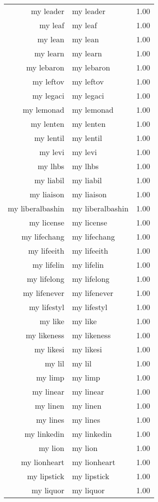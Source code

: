 \begin{table}[ht]
\begin{tabular}{rlr}
  my leader & my leader & 1.00 \\ 
  my leaf & my leaf & 1.00 \\ 
  my lean & my lean & 1.00 \\ 
  my learn & my learn & 1.00 \\ 
  my lebaron & my lebaron & 1.00 \\ 
  my leftov & my leftov & 1.00 \\ 
  my legaci & my legaci & 1.00 \\ 
  my lemonad & my lemonad & 1.00 \\ 
  my lenten & my lenten & 1.00 \\ 
  my lentil & my lentil & 1.00 \\ 
  my levi & my levi & 1.00 \\ 
  my lhbs & my lhbs & 1.00 \\ 
  my liabil & my liabil & 1.00 \\ 
  my liaison & my liaison & 1.00 \\ 
  my liberalbashin & my liberalbashin & 1.00 \\ 
  my license & my license & 1.00 \\ 
  my lifechang & my lifechang & 1.00 \\ 
  my lifeeith & my lifeeith & 1.00 \\ 
  my lifelin & my lifelin & 1.00 \\ 
  my lifelong & my lifelong & 1.00 \\ 
  my lifenever & my lifenever & 1.00 \\ 
  my lifestyl & my lifestyl & 1.00 \\ 
  my like & my like & 1.00 \\ 
  my likeness & my likeness & 1.00 \\ 
  my likesi & my likesi & 1.00 \\ 
  my lil & my lil & 1.00 \\ 
  my limp & my limp & 1.00 \\ 
  my linear & my linear & 1.00 \\ 
  my linen & my linen & 1.00 \\ 
  my lines & my lines & 1.00 \\ 
  my linkedin & my linkedin & 1.00 \\ 
  my lion & my lion & 1.00 \\ 
  my lionheart & my lionheart & 1.00 \\ 
  my lipstick & my lipstick & 1.00 \\ 
  my liquor & my liquor & 1.00 \\ 

\end{tabular}
\end{table}
